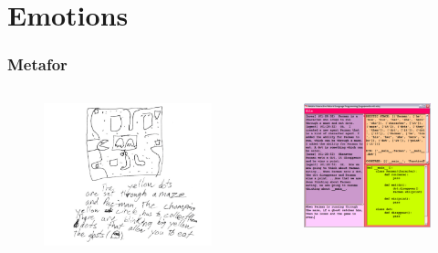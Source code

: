 \documentclass[12pt, aspectratio=169]{beamer}
\begin{document}
\section{Emotions}
\begin{frame}
\frametitle{Metafor}
\begin{columns}[c] %
\begin{figure}
\includegraphics[width=1.0\linewidth]{metafor}
\end{figure}
\begin{figure}
\includegraphics[width=1.0\linewidth]{metafor_gui}
\end{figure}
\end{columns}
\end{frame}
\end{document}
